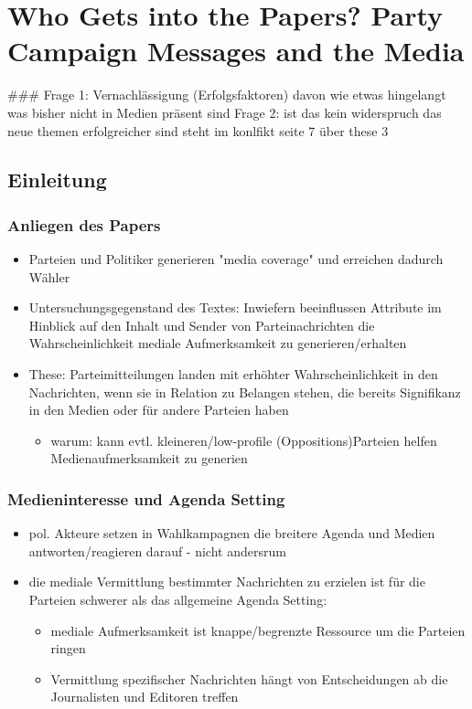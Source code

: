 \documentclass[11pt]{article}
\date{\today}
\title{}
\begin{document}
\tableofcontents

\section{Who Gets into the Papers? Party Campaign Messages and the Media}
\label{sec:orgab55e7e}
\#\#\#
Frage 1: Vernachlässigung (Erfolgsfaktoren) davon wie etwas hingelangt was bisher nicht in Medien präsent sind
Frage 2: ist das kein widerspruch das neue themen erfolgreicher sind steht im konlfikt seite 7 über these 3
\subsection{Einleitung}
\label{sec:org9b71115}
\subsubsection{Anliegen des Papers}
\label{sec:orge98d0c7}
\begin{itemize}
\item Parteien und Politiker generieren "media coverage" und erreichen dadurch Wähler
\item Untersuchungsgegenstand des Textes: Inwiefern beeinflussen Attribute im Hinblick auf den Inhalt und Sender von Parteinachrichten die Wahrscheinlichkeit mediale Aufmerksamkeit zu generieren/erhalten
\item These: Parteimitteilungen landen mit erhöhter Wahrscheinlichkeit in den Nachrichten, wenn sie in Relation zu Belangen stehen, die bereits Signifikanz in den Medien oder für andere Parteien haben
\begin{itemize}
\item warum: kann evtl. kleineren/low-profile (Oppositions)Parteien helfen Medienaufmerksamkeit zu generien
\end{itemize}
\end{itemize}

\subsubsection{Medieninteresse und Agenda Setting}
\label{sec:org3ef1192}
\begin{itemize}
\item pol. Akteure setzen in Wahlkampagnen die breitere Agenda und Medien antworten/reagieren darauf - nicht andersrum
\item die mediale Vermittlung bestimmter Nachrichten zu erzielen ist für die Parteien schwerer als das allgemeine Agenda Setting:
\begin{itemize}
\item mediale Aufmerksamkeit ist knappe/begrenzte Ressource um die Parteien ringen
\item Vermittlung spezifischer Nachrichten hängt von Entscheidungen ab die Journalisten und Editoren treffen
\end{itemize}
\end{itemize}
\end{document}
